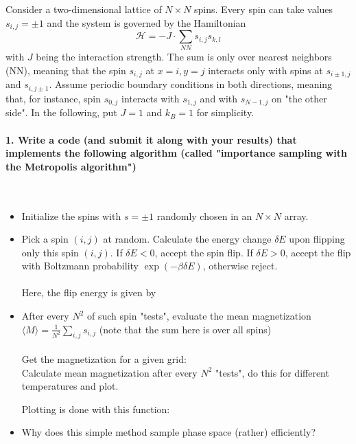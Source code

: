 
Consider a two-dimensional lattice of $N\times N$ spins. 
Every spin can take values $s_{i,j}=\pm1$ and the system 
is governed by the Hamiltonian
\begin{equation}
    \mathcal{H}=-J\cdot\sum_{NN}s_{i,j}s_{k,l}
\end{equation}
with $J$ being the interaction strength. The sum is only 
over nearest neighbors (NN), meaning that the spin 
$s_{i,j}$ at $x=i,y=j$ interacts only with spins at 
$s_{i\pm1,j}$ and $s_{i,j\pm1}$. Assume periodic boundary
conditions in both directions, meaning that, for instance, 
spin $s_{0,j}$ interacts with $s_{1,j}$ and with 
$s_{N-1,j}$ on "the other side". In the following, put 
$J=1$ and $k_B=1$ for simplicity.

\paragraph{1. Write a code (and submit it along with your 
    results) that implements the following algorithm
    (called "importance sampling with the Metropolis 
    algorithm")
} \ \\

\begin{itemize}
    \item Initialize the spins with $s=\pm1$ randomly 
        chosen in an $N\times N$ array. \\
        
    \item Pick a spin $(i,j)$ at random. Calculate the 
        energy change $\delta E$ upon flipping only this 
        spin $(i,j)$. If $\delta E<0$, accept the spin 
        flip. If $\delta E>0$, accept the flip with 
        Boltzmann probability $\exp(-\beta\delta E)$, 
        otherwise reject. \\
         \ \\
        \newpage
        Here, the flip energy is given by
        

    \item After every $N^2$ of such spin "tests", 
        evaluate the mean magnetization 
        $\langle M\rangle=\frac{1}{N^2}\sum_{i,j}s_{i,j}$
        (note that the sum here is over all spins) \\
        \\
        Get the magnetization for a given grid:
         \ \\
        Calculate mean magnetization after every $N^2$ "tests",
        do this for different temperatures and plot.
        
        \newpage
        Plotting is done with this function: 
         \ \\

    \item Why does this simple method sample phase 
        space (rather) efficiently?
\end{itemize}

